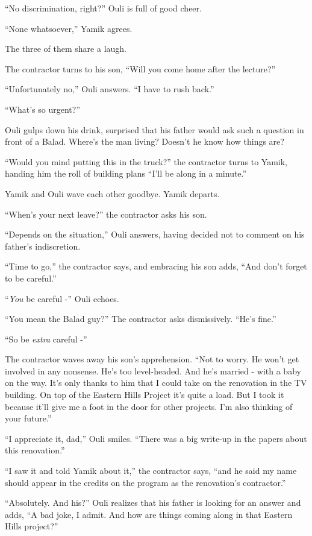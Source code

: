 \documentclass[twoside,11pt]{book}
\begin{document}
``No discrimination, right?'' Ouli is full of good cheer.

``None whatsoever,'' Yamik agrees.

The three of them share a laugh.

The contractor turns to his son, ``Will you come home after the lecture?''

``Unfortunately no,'' Ouli answers. ``I have to rush back.''

``What's so urgent?''

Ouli gulps down his drink, surprised that his father would ask such a question in front of a Balad. Where's the man
living? Doesn't he know how things are? \

``Would you mind putting this in the truck?'' the contractor turns to Yamik, handing him the roll of building plans
``I'll be along in a minute.''

Yamik and Ouli wave each other goodbye. Yamik departs.

``When's your next leave?'' the contractor asks his son.

``Depends on the situation,'' Ouli answers, having decided not to comment on his father's
indiscretion.

``Time to go,'' the contractor says, and embracing his son adds, ``And don't
forget to be careful.''

``\textit{You} be careful -'' Ouli echoes.

``You mean the Balad guy?'' The contractor asks dismissively. ``He's
fine.''

``So be \textit{extra} careful -''

The contractor waves away his son's apprehension.  ``Not to worry. He won't get involved in any nonsense.
He's too level-headed. And he's married - with a baby on the way. It's only thanks to him that I could take on the
renovation in the TV building. On top of the Eastern Hills Project it's quite a load. But I took it because it'll give
me a foot in the door for other projects. I'm also thinking of your future.''

``I appreciate it, dad,'' Ouli smiles. ``There was a big write-up in the papers
about this renovation.''

``I saw it and told Yamik about it,'' the contractor says, ``and he said my name
should appear in the credits on the program as the renovation's contractor.''

``Absolutely. And his?'' Ouli realizes that his father is looking for an answer and adds,
``A bad joke, I admit. And how are things coming along in that Eastern Hills project?''
\end{document}
